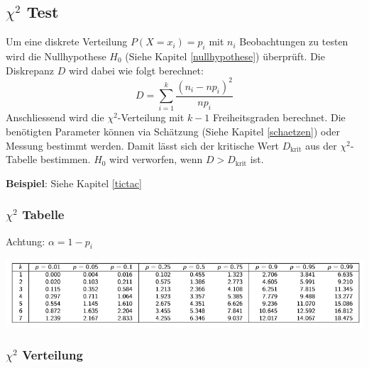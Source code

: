 \subsection{$\chi^2$ Test}
Um eine diskrete Verteilung $P(X = x_i) = p_i$ mit $n_i$ Beobachtungen zu testen wird die Nullhypothese $H_0$ (Siehe Kapitel \ref{nullhypothese}) überprüft. Die Diskrepanz $D$ wird dabei wie folgt berechnet:
\[
D = \sum_{i=1}^{k}\frac{(n_i - np_i)^2}{np_i}
\]
Anschliessend wird die $\chi^2$-Verteilung mit $k-1$ Freiheitsgraden berechnet. Die benötigten Parameter können via Schätzung (Siehe Kapitel \ref{schaetzen}) oder Messung bestimmt werden. Damit lässt sich der kritische Wert $D_\text{krit}$ aus der $\chi^2$-Tabelle bestimmen. $H_0$ wird verworfen, wenn $D > D_\text{krit}$ ist.

\noindent\textbf{Beispiel}: Siehe Kapitel \ref{tictac}
\subsubsection{$\chi^2$ Tabelle}
Achtung: $\alpha = 1 - p_i$
\begin{center}
	\includegraphics[width=\columnwidth]{Images/chi-tabelle}
\end{center}

\subsubsection{$\chi^2$ Verteilung}\label{chi-verteilung}

